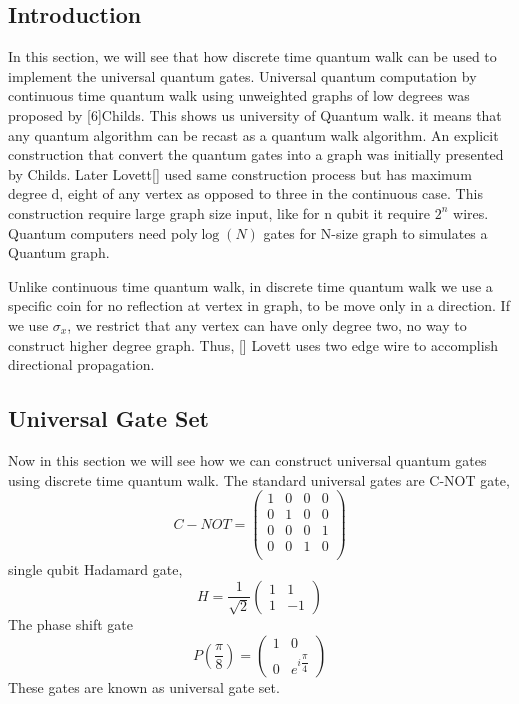 \documentclass[11 pt]{article}
\theoremstyle{definition}
\theoremstyle{remark}
\newcommand{\di}{i}
\begin{document}
\subsection{Introduction}
In this section, we will see that how discrete time quantum walk can be used to implement the universal quantum gates. Universal quantum computation by continuous time quantum walk using unweighted graphs of low degrees was proposed by [6]Childs. This shows us university of Quantum walk. it means that any quantum algorithm can be recast as a quantum walk algorithm. An explicit construction that convert the quantum gates into a graph was initially presented by Childs. Later Lovett[] used same construction process but has maximum degree d, eight of any vertex as opposed to three in the continuous case. This construction require large graph size input, like for n qubit it require $2^n$ wires. Quantum computers need poly$\log(N)$ gates for N-size graph to simulates a Quantum graph.

Unlike continuous time quantum walk, in discrete time quantum walk we use a specific coin for no reflection at vertex in graph, to be move only in a direction. If we use $\sigma_x$, we restrict that any vertex can have only degree two, no way to construct higher degree graph. Thus, [] Lovett uses two edge wire to accomplish directional propagation. 

\subsection{Universal Gate Set}
Now in this section we will see how we can construct universal quantum gates using discrete time quantum walk. The standard universal gates are C-NOT gate,
$$C-NOT = \begin{pmatrix}
           1 & 0 & 0& 0\\
           0 & 1 & 0& 0\\
           0 & 0 & 0& 1\\
           0 & 0 & 1& 0\\
\end{pmatrix}$$
single qubit Hadamard gate,
$$H = \dfrac{1}{\sqrt{2}}\begin{pmatrix}
           1 & 1 \\
           1 & -1  
\end{pmatrix}$$
The phase shift gate
$$P(\dfrac{\pi}{8}) = \begin{pmatrix}
           1 & 0 \\
           0 & e^{\di\dfrac{\pi}{4}}  
\end{pmatrix}$$
These gates are known as universal gate set.\\
\end{document}
